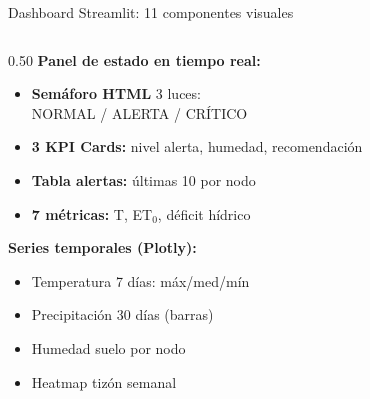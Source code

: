 \documentclass[14pt,aspectratio=169]{beamer}
\begin{document}
\begin{frame}{Dashboard Streamlit: 11 componentes visuales}
  \begin{columns}[T]
    \begin{column}{0.50\textwidth}
      \textbf{Panel de estado en tiempo real:}
      \begin{itemize}\small
        \item \textbf{Sem\'aforo HTML} 3 luces:\\
          \textcolor{green!60!black}{NORMAL} /
          \textcolor{orange!80!black}{ALERTA} /
          \textcolor{red!70!black}{CR\'ITICO}
        \item \textbf{3 KPI Cards:} nivel alerta, humedad,
          recomendaci\'on
        \item \textbf{Tabla alertas:} \'ultimas 10 por nodo
        \item \textbf{7 m\'etricas:} T, ET$_0$, d\'eficit h\'idrico
      \end{itemize}
      \vspace{0.3em}
      \textbf{Series temporales (Plotly):}
      \begin{itemize}\small
        \item Temperatura 7 d\'ias: m\'ax/med/m\'in
        \item Precipitaci\'on 30 d\'ias (barras)
        \item Humedad suelo por nodo
        \item Heatmap tiz\'on semanal
      \end{itemize}
    \end{column}


\end{columns}
\end{frame}
\end{document}
